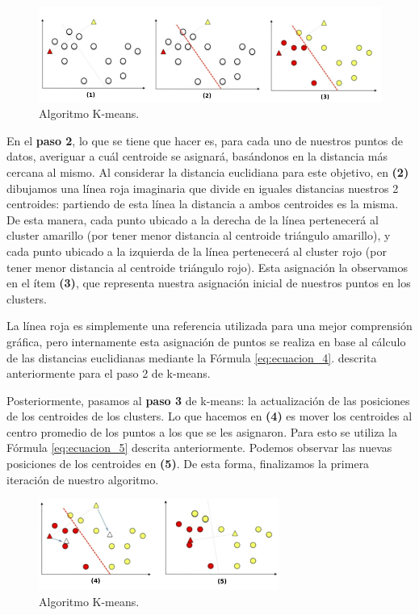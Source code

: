 \documentclass[12pt,a4paper]{article}
\begin{document}
\begin{sloppypar}
\begin{figure}[H]    %
 \centering
 \includegraphics[width=1\textwidth]{images/K_Means_1.png}
 \captionsetup{justification=centering,margin=2cm}
 \caption{Algoritmo K-means.} 
 \label{fig:K_means_working_1}
\end{figure}

En el \textbf{paso 2}, lo que se tiene que hacer es, para cada uno de nuestros puntos de datos, averiguar a cuál centroide se asignará, basándonos en la distancia más cercana al mismo.
Al considerar la distancia euclidiana para este objetivo, en \textbf{(2)} dibujamos una línea roja imaginaria que divide en iguales distancias nuestros 2 centroides: partiendo de esta línea la distancia a ambos centroides es la misma. De esta manera, cada punto ubicado a la derecha de la línea pertenecerá al cluster amarillo (por tener menor distancia al centroide triángulo amarillo), y cada punto ubicado a la izquierda de la línea pertenecerá al cluster rojo (por tener menor distancia al centroide triángulo rojo). Esta asignación la observamos en el ítem \textbf{(3)}, que representa nuestra asignación inicial de nuestros puntos en los clusters. 

La línea roja es simplemente una referencia utilizada para una mejor comprensión gráfica, pero internamente esta asignación de puntos se realiza en base al cálculo de las distancias euclidianas mediante la Fórmula \ref{eq:ecuacion_4}. descrita anteriormente para el paso 2 de k-means.

Posteriormente, pasamos al \textbf{paso 3} de k-means: la actualización de las posiciones de los centroides de los clusters. Lo que hacemos en \textbf{(4)} es mover los centroides al centro promedio de los puntos a los que se les asignaron. Para esto se utiliza la Fórmula \ref{eq:ecuacion_5} descrita anteriormente. Podemos observar las nuevas posiciones de los centroides en \textbf{(5)}. 
De esta forma, finalizamos la primera iteración de nuestro algoritmo. 

\begin{figure}[H]    %
 \centering
 \includegraphics[width=0.7\textwidth]{images/K_Means_2.png}
 \captionsetup{justification=centering,margin=2cm}
 \caption{Algoritmo K-means.}
\end{figure}


\end{sloppypar}
\end{document}
